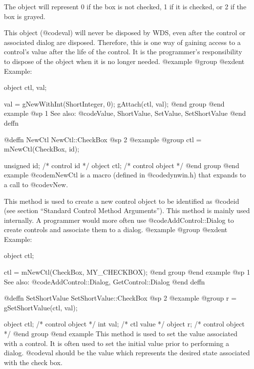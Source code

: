 {The object will represent 0 if the box is not checked, 1 if it is
checked, or 2 if the box is grayed.

This object (@code{val}) will never be disposed by WDS, even after
the control or associated dialog are disposed.  Therefore, this
is one way of gaining access to a control's value after the life
of the control.  It is the programmer's responsibility to dispose of
the object when it is no longer needed.
@example
@group
@exdent Example:

object  ctl, val;

val = gNewWithInt(ShortInteger, 0);
gAttach(ctl, val);
@end group
@end example
@sp 1
See also:  @code{Value, ShortValue, SetValue, SetShortValue}
@end deffn












@deffn {NewCtl} NewCtl::CheckBox
@sp 2
@example
@group
ctl = mNewCtl(CheckBox, id);

unsigned  id;   /*  control id      */
object   ctl;   /*  control object  */
@end group
@end example
@code{mNewCtl} is a macro (defined in @code{dynwin.h}) that expands to
a call to @code{vNew}.

This method is used to create a new control object to be identified as
@code{id} (see section ``Standard Control Method Arguments'').  This
method is mainly used internally.  A programmer would more often
use @code{AddControl::Dialog} to create controls and associate them
to a dialog.
@example
@group
@exdent Example:

object  ctl;

ctl = mNewCtl(CheckBox, MY_CHECKBOX);
@end group
@end example
@sp 1
See also:  @code{AddControl::Dialog, GetControl::Dialog}
@end deffn







@deffn {SetShortValue} SetShortValue::CheckBox
@sp 2
@example
@group
r = gSetShortValue(ctl, val);

object  ctl;    /*  control object  */
int     val;    /*  ctl value       */
object  r;      /*  control object  */
@end group
@end example
This method is used to set the value associated with a control.  It is
often used to set the initial value prior to performing a dialog.
@code{val} should be the value which represents the desired state associated
with the check box.

}
